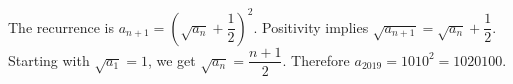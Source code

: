 The recurrence is $a_{n+1}=(\sqrt{a_n}+\dfrac{1}{2})^2$. Positivity implies $\sqrt{a_{n+1}}=\sqrt{a_n}+\dfrac{1}{2}$. Starting with $\sqrt{a_1}=1$, we get $\sqrt{a_n}=\dfrac{n+1}{2}$. Therefore $a_{2019}=1010^2=\boxed{1020100}$.
